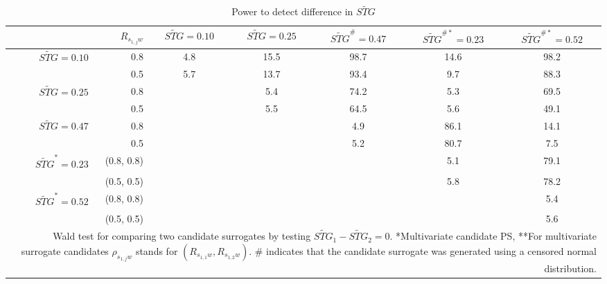 \documentclass[times, doublespace]{simauth}
\begin{document}
\begin{table}
\begin{center}
\begin{tabular}{lccccccc}
\end{tabular}
\end{center}
\end{table}



\begin{table}
\begin{center}
\caption{Power to detect difference in $\widetilde{STG}$ \label{IPow}}
\begin{tabular}{rrccccc}
  \hline
 & $R_{s_{1,j}w}$ & $\widetilde{STG}=0.10$  & $\widetilde{STG}=0.25$  & $\widetilde{STG}^{\#}=0.47$& $\widetilde{STG}^{\#*}=0.23$  & $\widetilde{STG}^{\#*}=0.52$\\
  \hline
$\widetilde{STG}=0.10$ & 0.8 & 4.8 & 15.5 & 98.7 & 14.6 & 98.2 \\ 
&  0.5  & 5.7 & 13.7 & 93.4 & 9.7 & 88.3 \\ 
 $\widetilde{STG}=0.25$ & 0.8 &  & 5.4 & 74.2 & 5.3 & 69.5 \\ 
&  0.5 &  & 5.5 & 64.5 & 5.6 & 49.1 \\ 
$\widetilde{STG}=0.47$ & 0.8 &  &  & 4.9 & 86.1 & 14.1 \\ 
 & 0.5 &  &  & 5.2 & 80.7 & 7.5 \\ 
$\widetilde{STG}^{*}=0.23$ & (0.8, 0.8) &  &  &  & 5.1 & 79.1 \\ 
&  (0.5, 0.5) &  &  &  & 5.8 & 78.2 \\ 
$\widetilde{STG}^{*}=0.52$ & (0.8, 0.8) &  &  &  &  & 5.4 \\ 
 & (0.5, 0.5) &  &  &  &  & 5.6 \\ 
   \hline
\multicolumn{7}{p{9in}}{Wald test for comparing two candidate surrogates by testing $\widetilde{STG}_1-\widetilde{STG}_2=0$. *Multivariate candidate PS, **For multivariate surrogate candidates $\rho_{s_{1,j}w}$ stands for $(R_{s_{1,1}w},R_{s_{1,2}w})$. \# indicates that the candidate surrogate was generated using a censored normal distribution.}
\end{tabular}
\end{center}
\end{table}
\end{document}
